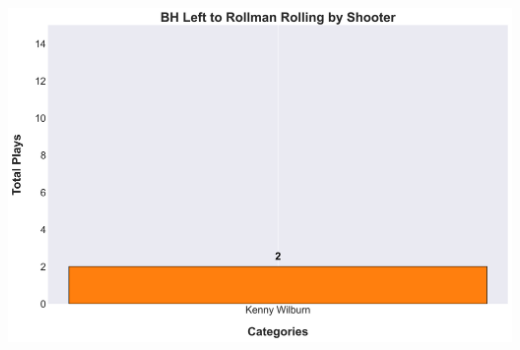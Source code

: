 \documentclass[a4paper,12pt]{article}
\begin{document}
\begin{table}[H]
{\begin{minipage}[t]{0.6\textwidth}
{\begin{tabular}
            \bottomrule
        \end{tabular}
        } %
    \end{minipage}
    } %
    \hfill %
    \begin{minipage}[c]{0.35\textwidth} %
        \flushright
        \includegraphics[width=\textwidth, height=.14\textheight]{images/PNR_PassLeftRollsPlayer_Freq.png} %
    \end{minipage}
\end{table}

\vspace{-1em} %
\vspace{-1em} %
\end{document}
